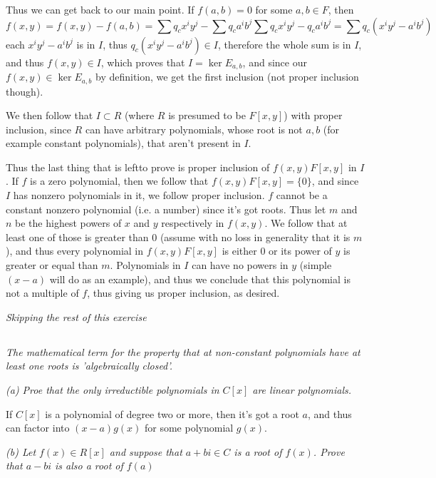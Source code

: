 \documentclass[11pt,oneside,titlepage]{book}
\newcommand{\set}[1]{\{ #1 \}}
\begin{document}
Thus we can get back to our main point. If $f(a, b) = 0$ for some $a,
b \in F$, then
$$f(x, y) = f(x, y) - f(a, b) = \sum{q_c x^i y^j} - \sum{q_c a^i b^j} 
\sum{q_c x^i y^j - q_c a^i b^j} = \sum{q_c (x^i y^j - a^i b^j)}$$ each
$x^i y^j - a^i b^j$ is in $I$, thus $q_c(x^i y^j - a^i b^j) \in I$,
therefore the whole sum is in $I$, and thus $f(x, y) \in I$, which
proves that $I = \ker{E_{a, b}}$, and since our $f(x, y) \in
\ker{E_{a, b}}$ by definition, we get the first inclusion (not proper
inclusion though).

We then follow that $I \subset R$ (where $R$ is presumed to be $F[x,
y]$) with proper inclusion, since $R$ can have arbitrary polynomials,
whose root is not $a, b$ (for example constant polynomials), that
aren't present in $I$.

Thus the last thing that is leftto prove is proper inclusion of
$f(x, y)F[x, y]$ in $I$. If $f$ is a zero polynomial, then we follow
that $f(x, y)F[x, y] = \set{0}$, and since $I$ has nonzero polynomials
in it, we follow proper inclusion. $f$ cannot be a constant nonzero
polynomial (i.e. a number) since it's got roots. Thus let $m$ and $n$
be the highest powers of $x$ and $y$ respectively in $f(x, y)$. We follow
that at least one of those is greater than $0$ (assume with no loss in
generality that it is $m$), and thus every
polynomial in $f(x, y) F[x, y]$ is either $0$ or its power of $y$ is
greater or equal than $m$. Polynomials in $I$ can have no powers in $y$
(simple $(x - a)$ will do as an example), and thus we conclude that
this polynomial is not a multiple of $f$, thus giving us proper inclusion,
as desired.

\textit{Skipping the rest of this exercise}

\subsection{}

\textit{The mathematical term for the property that at non-constant
polynomials have at least one roots is 'algebraically closed'.}

\textit{(a) Proe that the only irreductible polynomials in $C[x]$ are
linear polynomials.}

If $C[x]$ is a polynomial of degree two or more, then it's got a root
$a$, and thus can factor into $(x - a)g(x)$ for some polynomial
$g(x)$.

\textit{(b) Let $f(x) \in R[x]$ and suppose that $a + bi \in C$ is a
  root of $f(x)$. Prove that $a - bi$ is also a root of $f(a)$}
\end{document}
